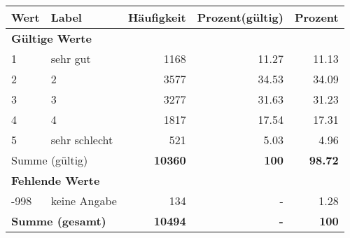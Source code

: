      \begin{longtable}{lXrrr}
     \toprule
     \textbf{Wert} & \textbf{Label} & \textbf{Häufigkeit} & \textbf{Prozent(gültig)} & \textbf{Prozent} \\
     \endhead
     \midrule
     \multicolumn{5}{l}{\textbf{Gültige Werte}}\\

     1 &
     \multicolumn{1}{X}{ sehr gut   } &


       \num{1168} &
       \num[round-mode=places,round-precision=2]{11.27} &
         \num[round-mode=places,round-precision=2]{11.13} \\

     2 &
     \multicolumn{1}{X}{ 2   } &


       \num{3577} &
       \num[round-mode=places,round-precision=2]{34.53} &
         \num[round-mode=places,round-precision=2]{34.09} \\

     3 &
     \multicolumn{1}{X}{ 3   } &


       \num{3277} &
       \num[round-mode=places,round-precision=2]{31.63} &
         \num[round-mode=places,round-precision=2]{31.23} \\

     4 &
     \multicolumn{1}{X}{ 4   } &


       \num{1817} &
       \num[round-mode=places,round-precision=2]{17.54} &
         \num[round-mode=places,round-precision=2]{17.31} \\

     5 &
     \multicolumn{1}{X}{ sehr schlecht   } &


       \num{521} &
       \num[round-mode=places,round-precision=2]{5.03} &
         \num[round-mode=places,round-precision=2]{4.96} \\
     \midrule
     \multicolumn{2}{l}{Summe (gültig)} &
       \textbf{\num{10360}} &
     \textbf{\num{100}} &
       \textbf{\num[round-mode=places,round-precision=2]{98.72}} \\
     \multicolumn{5}{l}{\textbf{Fehlende Werte}}\\
       -998 &
       keine Angabe &
         \num{134} &
        - &
         \num[round-mode=places,round-precision=2]{1.28} \\
     \midrule
     \multicolumn{2}{l}{\textbf{Summe (gesamt)}} &
          \textbf{\num{10494}} &
        \textbf{-} &
        \textbf{\num{100}} \\
     \bottomrule
     \end{longtable}
     
